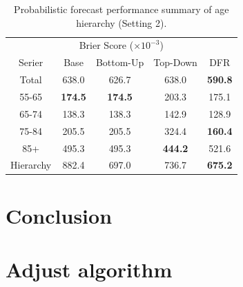 \documentclass[a4paper,review,12pt,authoryear]{elsarticle}
\begin{document}
\begin{table}[h]
  \centering
  \caption{\label{tab:mortality_age2} Probabilistic forecast performance summary of age hierarchy (Setting 2).}
  \begin{tabular}{ccccc}
  \toprule
  \multicolumn{5}{c}{Brier Score ($\times 10^{-3}$)}\\ 
  Serier & Base & Bottom-Up & Top-Down & DFR \\\midrule
  Total & 638.0 & 626.7 & 638.0 & \textbf{590.8} \\
  55-65 & \textbf{174.5} & \textbf{174.5} & 203.3 & 175.1 \\
  65-74 & 138.3 & 138.3 & 142.9 & 128.9\\
  75-84 & 205.5 & 205.5 & 324.4 & \textbf{160.4}\\
  85+ & 495.3 & 495.3 & \textbf{444.2} & 521.6\\
  Hierarchy & 882.4 & 697.0 & 736.7 & \textbf{675.2} \\
  \bottomrule
 \end{tabular}
\end{table}

\section{Conclusion}
\label{sec:conclusion}

\newpage

\appendix
\section{Adjust algorithm}
\label{appendix:adjust}


\newpage



\end{document}
